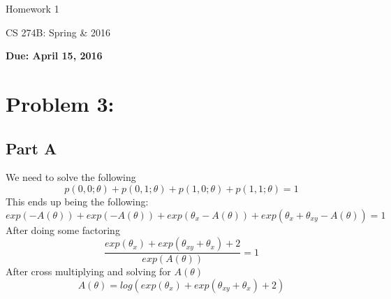 \documentclass[twoside,11pt]{article}
\theoremstyle{definition}
\begin{document}
\centerline{\Large Homework 1}
\centerline{CS 274B: Spring \& 2016}
\centerline{\bf Due: April 15, 2016}


\section*{Problem 3: }

\subsection*{Part A}

We need to solve the following
\[
p(0,0;\theta) + p(0,1;\theta) + p(1,0;\theta) + p(1,1;\theta) = 1
\]
This ends up being the following:
\[
exp(-A(\theta)) + exp(-A(\theta)) + exp(\theta_x - A(\theta)) + exp(\theta_x + \theta_{xy} - A(\theta)) = 1
\]
After doing some factoring
\[
\frac{exp(\theta_x) + exp(\theta_{xy} + \theta_x) + 2}{exp(A(\theta))} = 1
\]
After cross multiplying and solving for $A(\theta)$
\[
A(\theta) = log( exp(\theta_x) + exp(\theta_{xy} + \theta_x) + 2 )
\]
\end{document}
